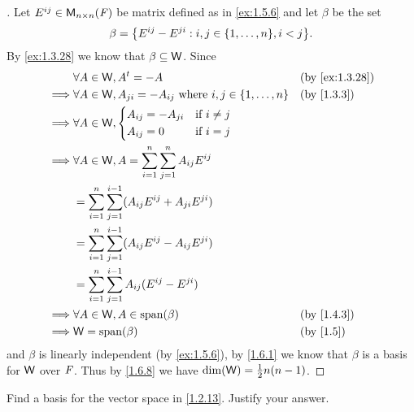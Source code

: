 \begin{proof}[]
  Let \(E^{i j} \in \mathsf{M}_{{n} \times n}({\mathit{F}})\) be matrix defined as in \cref{ex:1.5.6} and let \(\beta\) be the set
  \[
    \beta = \set{E^{i j} - E^{j i} : i, j \in \set{1, \dots, n}, i < j}.
  \]
  By \cref{ex:1.3.28} we know that \(\beta \subseteq \mathsf{W}\).
  Since
  \begin{align*}
             & \forall A \in \W, \tp{A} = -A                                                  &  & \text{(by \cref{ex:1.3.28})} \\
    \implies & \forall A \in \W, A_{j i} = -A_{i j} \text{ where } i, j \in \set{1, \dots, n} &  & \text{(by \cref{1.3.3})}     \\
    \implies & \forall A \in \W, \begin{dcases}
                                   A_{i j} = -A_{j i} & \text{if } i \neq j \\
                                   A_{i j} = 0        & \text{if } i = j
                                 \end{dcases}                                                       \\
    \implies & \forall A \in \W, A = \sum_{i = 1}^n \sum_{j = 1}^n A_{i j} E^{i j}                                              \\
             & = \sum_{i = 1}^n \sum_{j = 1}^{i - 1} (A_{i j} E^{i j} + A_{j i} E^{j i})                                        \\
             & = \sum_{i = 1}^n \sum_{j = 1}^{i - 1} (A_{i j} E^{i j} - A_{i j} E^{j i})                                        \\
             & = \sum_{i = 1}^n \sum_{j = 1}^{i - 1} A_{i j} (E^{i j} - E^{j i})                                                \\
    \implies & \forall A \in \W, A \in \spn{\beta}                                            &  & \text{(by \cref{1.4.3})}     \\
    \implies & \W = \spn{\beta}                                                               &  & \text{(by \cref{1.5})}
  \end{align*}
  and \(\beta\) is linearly independent (by \cref{ex:1.5.6}), by \cref{1.6.1} we know that \(\beta\) is a basis for \(\mathsf{W}\) over \(\mathit{F}\).
  Thus by \cref{1.6.8} we have \(\dim(\mathsf{W}) = \frac{1}{2} n(n - 1)\).
\end{proof}

\begin{ex}\label{ex:1.6.18}
  Find a basis for the vector space in \cref{1.2.13}.
  Justify your answer.
\end{ex}

